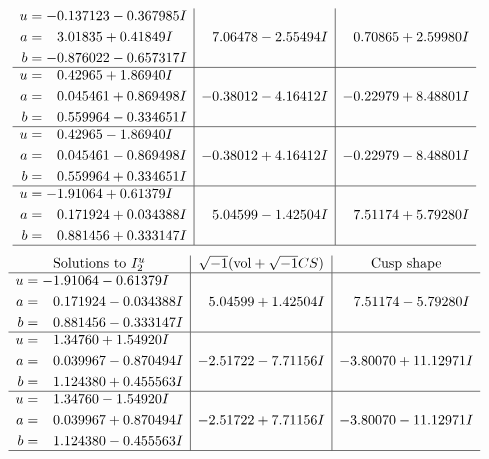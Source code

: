 \documentclass[1p]{elsarticle_modified}
\theoremstyle{definition}
\newcommand{\I}{\sqrt{-1}}
\begin{document}
$$\begin{array}{c|c|c}
\begin{aligned}
u &= -0.137123 - 0.367985 I \\
a &= \phantom{-}3.01835 + 0.41849 I \\
b &= -0.876022 - 0.657317 I\end{aligned}
 & \phantom{-}7.06478 - 2.55494 I & \phantom{-}0.70865 + 2.59980 I \\ \hline\begin{aligned}
u &= \phantom{-}0.42965 + 1.86940 I \\
a &= \phantom{-}0.045461 + 0.869498 I \\
b &= \phantom{-}0.559964 - 0.334651 I\end{aligned}
 & -0.38012 - 4.16412 I & -0.22979 + 8.48801 I \\ \hline\begin{aligned}
u &= \phantom{-}0.42965 - 1.86940 I \\
a &= \phantom{-}0.045461 - 0.869498 I \\
b &= \phantom{-}0.559964 + 0.334651 I\end{aligned}
 & -0.38012 + 4.16412 I & -0.22979 - 8.48801 I \\ \hline\begin{aligned}
u &= -1.91064 + 0.61379 I \\
a &= \phantom{-}0.171924 + 0.034388 I \\
b &= \phantom{-}0.881456 + 0.333147 I\end{aligned}
 & \phantom{-}5.04599 - 1.42504 I & \phantom{-}7.51174 + 5.79280 I\\
 \hline 
 \end{array}$$\newpage$$\begin{array}{c|c|c}  
\text{Solutions to }I^u_{2}& \I (\text{vol} + \sqrt{-1}CS) & \text{Cusp shape}\\
 \hline 
\begin{aligned}
u &= -1.91064 - 0.61379 I \\
a &= \phantom{-}0.171924 - 0.034388 I \\
b &= \phantom{-}0.881456 - 0.333147 I\end{aligned}
 & \phantom{-}5.04599 + 1.42504 I & \phantom{-}7.51174 - 5.79280 I \\ \hline\begin{aligned}
u &= \phantom{-}1.34760 + 1.54920 I \\
a &= \phantom{-}0.039967 - 0.870494 I \\
b &= \phantom{-}1.124380 + 0.455563 I\end{aligned}
 & -2.51722 - 7.71156 I & -3.80070 + 11.12971 I \\ \hline\begin{aligned}
u &= \phantom{-}1.34760 - 1.54920 I \\
a &= \phantom{-}0.039967 + 0.870494 I \\
b &= \phantom{-}1.124380 - 0.455563 I\end{aligned}
 & -2.51722 + 7.71156 I & -3.80070 - 11.12971 I\\
 \hline 
 \end{array}$$\newpage\newpage\renewcommand{\arraystretch}{1}
\end{document}
